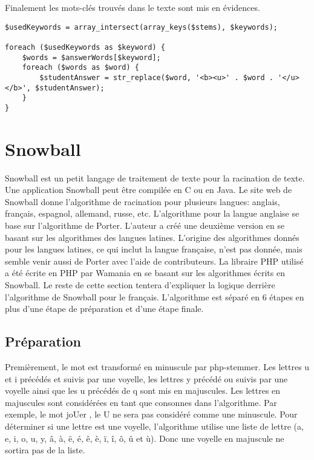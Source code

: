 Finalement les mots-clés trouvés dans le texte sont mis en évidences.

\begin{lstlisting}[frame=l]
$usedKeywords = array_intersect(array_keys($stems), $keywords);

foreach ($usedKeywords as $keyword) {
	$words = $answerWords[$keyword];
	foreach ($words as $word) {
		$studentAnswer = str_replace($word, '<b><u>' . $word . '</u></b>', $studentAnswer);
	}
}
\end{lstlisting}

\section{Snowball}

Snowball est un petit langage de traitement de texte pour la racination de texte. Une application Snowball peut être compilée en C ou en Java. Le site web de Snowball donne l'algorithme de racination pour plusieurs langues: anglais, français, espagnol, allemand, russe, etc. L'algorithme pour la langue anglaise se base sur l'algorithme de Porter. L'auteur a créé une deuxième version en se basant sur les algorithmes des langues latines. L'origine des algorithmes donnés pour les langues latines, ce qui inclut la langue française, n'est pas donnée, mais semble venir aussi de Porter avec l'aide de contributeurs. La libraire PHP utilisé a été écrite en PHP par Wamania en se basant sur les algorithmes écrits en Snowball. Le reste de cette section tentera d'expliquer la logique derrière l'algorithme de Snowball pour le français. L'algorithme est séparé en 6 étapes en plus d'une étape de préparation et d'une étape finale.

\subsection*{Préparation}

Premièrement, le mot est transformé en minuscule par php-stemmer. Les lettres u et i précédés et suivis par une voyelle, les lettres y précédé ou suivis par une voyelle ainsi que les u précédés de q sont mis en majuscules. Les lettres en majuscules sont considérées en tant que consonnes dans l'algorithme. Par exemple, le mot \og joUer \fg{}, le U ne sera pas considéré comme une minuscule. Pour déterminer si une lettre est une voyelle, l'algorithme utilise une liste de lettre (a, e, i, o, u, y, â, à, ë, é, ê, è, ï, î, ô, û et ù). Donc une voyelle en majuscule ne sortira pas de la liste.

